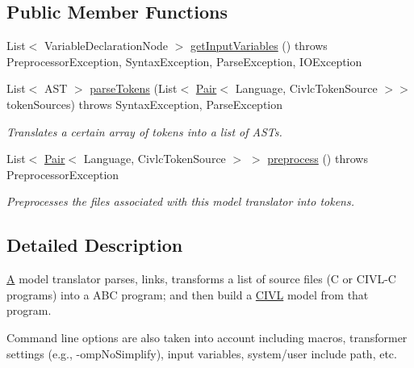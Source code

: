 \subsection*{Public Member Functions}
\begin{DoxyCompactItemize}
\item 
List$<$ Variable\+Declaration\+Node $>$ \hyperlink{classedu_1_1udel_1_1cis_1_1vsl_1_1civl_1_1run_1_1IF_1_1ModelTranslator_aa51f6dec9a7c437d3bc27507b991fd15}{get\+Input\+Variables} ()  throws Preprocessor\+Exception, Syntax\+Exception, Parse\+Exception, 			\+I\+O\+Exception 
\item 
List$<$ A\+S\+T $>$ \hyperlink{classedu_1_1udel_1_1cis_1_1vsl_1_1civl_1_1run_1_1IF_1_1ModelTranslator_a0f21fa728644647c22cc39219d31955f}{parse\+Tokens} (List$<$ \hyperlink{classedu_1_1udel_1_1cis_1_1vsl_1_1civl_1_1util_1_1IF_1_1Pair}{Pair}$<$ Language, Civlc\+Token\+Source $>$$>$ token\+Sources)  throws Syntax\+Exception, Parse\+Exception 
\begin{DoxyCompactList}\small\item\em Translates a certain array of tokens into a list of A\+S\+T\textquotesingle{}s. \end{DoxyCompactList}\item 
List$<$ \hyperlink{classedu_1_1udel_1_1cis_1_1vsl_1_1civl_1_1util_1_1IF_1_1Pair}{Pair}$<$ Language, Civlc\+Token\+Source $>$ $>$ \hyperlink{classedu_1_1udel_1_1cis_1_1vsl_1_1civl_1_1run_1_1IF_1_1ModelTranslator_ab77793984cfdaea91e00bb9d609998e4}{preprocess} ()  throws Preprocessor\+Exception 
\begin{DoxyCompactList}\small\item\em Preprocesses the files associated with this model translator into tokens. \end{DoxyCompactList}\end{DoxyCompactItemize}


\subsection{Detailed Description}
\hyperlink{structA}{A} model translator parses, links, transforms a list of source files (C or C\+I\+V\+L-\/\+C programs) into a A\+B\+C program; and then build a \hyperlink{classedu_1_1udel_1_1cis_1_1vsl_1_1civl_1_1CIVL}{C\+I\+V\+L} model from that program. 

Command line options are also taken into account including macros, transformer settings (e.\+g., -\/omp\+No\+Simplify), input variables, system/user include path, etc. 

